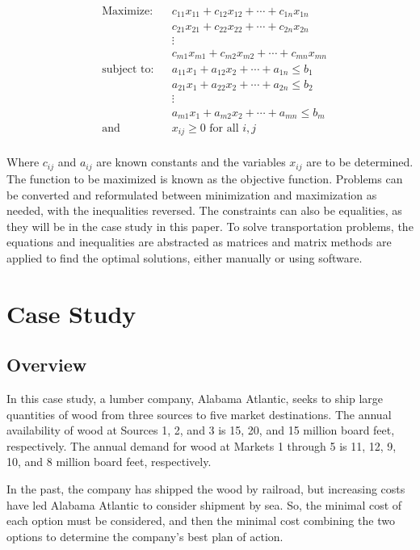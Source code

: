 \documentclass[12pt,letterpaper]{article}
\begin{document}
$$
\begin{aligned}
& \text{Maximize:}
& & c_{11}x_{11} + c_{12}x_{12} + \cdots + c_{1n}x_{1n} \\
&&& c_{21}x_{21} + c_{22}x_{22} + \cdots + c_{2n}x_{2n} \\
&&& \vdots \\
&&& c_{m1}x_{m1} + c_{m2}x_{m2} + \cdots + c_{mn}x_{mn} \\
& \text{subject to:}
& & a_{11}x_1 + a_{12}x_2 + \cdots + a_{1n} \leq b_1 \\
&&& a_{21}x_1 + a_{22}x_2 + \cdots + a_{2n} \leq b_2 \\
&&& \vdots \\
&&& a_{m1}x_1 + a_{m2}x_2 + \cdots + a_{mn} \leq b_m \\
& \text{and}
& & x_{ij} \geq 0 \text{ for all } i, j \\
\end{aligned}
$$

Where $c_{ij}$ and $a_{ij}$ are known constants and the variables $x_{ij}$ are to be determined.  The function to be
maximized is known as the objective function.  Problems can be converted and reformulated between minimization and
maximization as needed, with the inequalities reversed.  The constraints can also be equalities, as they will be in the
case study in this paper.  To solve transportation problems, the equations and inequalities are abstracted as matrices
and matrix methods are applied to find the optimal solutions, either manually or using software.


\section{Case Study}
\subsection{Overview}
In this case study, a lumber company, Alabama Atlantic, seeks to ship large quantities of wood from three sources to
five market destinations.  The annual availability of wood at Sources 1, 2, and 3 is 15, 20, and 15 million board feet,
respectively.  The annual demand for wood at Markets 1 through 5 is 11, 12, 9, 10, and 8 million board feet,
respectively.

In the past, the company has shipped the wood by railroad, but increasing costs have led Alabama Atlantic to consider
shipment by sea.  So, the minimal cost of each option must be considered, and then the minimal cost combining the two
options to determine the company's best plan of action.
\end{document}
